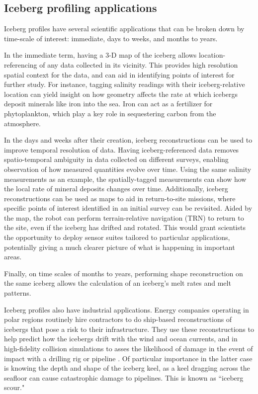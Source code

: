 \subsection{Iceberg profiling applications}

Iceberg profiles have several scientific applications that can be broken down by time-scale of interest: immediate, days to weeks, and months to years. 

In the immediate term, having a 3-D map of the iceberg allows location-referencing of any data collected in its vicinity. This provides high resolution spatial context for the data, and can aid in identifying points of interest for further study. For instance, tagging salinity readings with their iceberg-relative location can yield insight on how geometry affects the rate at which icebergs deposit minerals like iron into the sea. Iron can act as a fertilizer for phytoplankton, which play a key role in sequestering carbon from the atmosphere.

In the days and weeks after their creation, iceberg reconstructions can be used to improve temporal resolution of data. Having iceberg-referenced data removes spatio-temporal ambiguity in data collected on different surveys, enabling observation of how measured quantities evolve over time. Using the same salinity measurements as an example, the spatially-tagged measurements can show how the local rate of mineral deposits changes over time. Additionally, iceberg reconstructions can be used as maps to aid in return-to-site missions, where specific points of interest identified in an initial survey can be revisited. Aided by the map, the robot can perform terrain-relative navigation (TRN) to return to the site, even if the iceberg has drifted and rotated\cite{Kimball2011b}. This would grant scientists the opportunity to deploy sensor suites tailored to particular applications, potentially giving a much clearer picture of what is happening in important areas.

Finally, on time scales of months to years, performing shape reconstruction on the same iceberg allows the calculation of an iceberg's melt rates and melt patterns.

Iceberg profiles also have industrial applications. Energy companies operating in polar regions routinely hire contractors to do ship-based reconstructions of icebergs that pose a risk to their infrastructure. They use these reconstructions to help predict how the icebergs drift with the wind and ocean currents, and in high-fidelity collision simulations to asses the likelihood of damage in the event of impact with a drilling rig or pipeline \cite{ralph2008iceberg} \cite{fuglem1996iceberg}. Of particular importance in the latter case is knowing the depth and shape of the iceberg keel, as a keel dragging across the seafloor can cause catastrophic damage to pipelines. This is known as ``iceberg scour."

